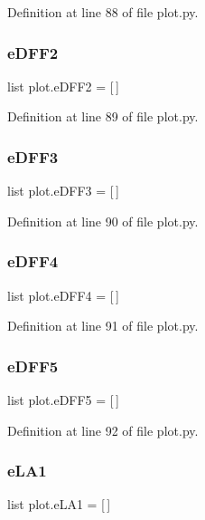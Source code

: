 Definition at line 88 of file plot.\+py.

\mbox{\label{namespaceplot_a7a1cea06c2add74d34ca20a42fa9e4c2}} 
\subsubsection{e\+D\+F\+F2}
{\footnotesize\ttfamily list plot.\+e\+D\+F\+F2 = [$\,$]}



Definition at line 89 of file plot.\+py.

\mbox{\label{namespaceplot_a1fad637851aa2343912ee8768ca3e659}} 
\subsubsection{e\+D\+F\+F3}
{\footnotesize\ttfamily list plot.\+e\+D\+F\+F3 = [$\,$]}



Definition at line 90 of file plot.\+py.

\mbox{\label{namespaceplot_a30fdd97fa6ce7e0c1119c6ce79dafcfc}} 
\subsubsection{e\+D\+F\+F4}
{\footnotesize\ttfamily list plot.\+e\+D\+F\+F4 = [$\,$]}



Definition at line 91 of file plot.\+py.

\mbox{\label{namespaceplot_a392e37e2f1a4d13e3d2e37bb04a25f48}} 
\subsubsection{e\+D\+F\+F5}
{\footnotesize\ttfamily list plot.\+e\+D\+F\+F5 = [$\,$]}



Definition at line 92 of file plot.\+py.

\mbox{\label{namespaceplot_a927648cc02ba5e73c48a3c4a8fa0e6a7}} 
\subsubsection{e\+L\+A1}
{\footnotesize\ttfamily list plot.\+e\+L\+A1 = [$\,$]}



